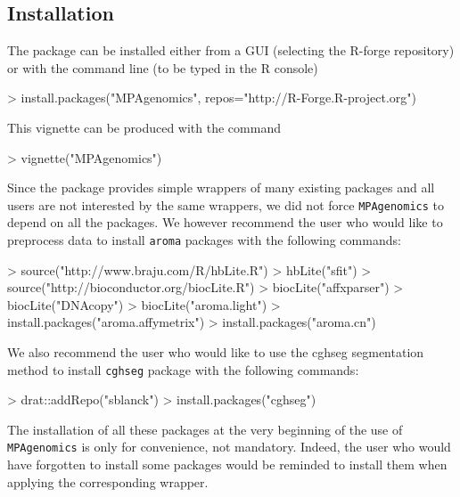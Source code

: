 \documentclass[a4paper,10pt]{article}
\begin{document}
  \subsection{Installation}
		The package can be installed either from a GUI (selecting the R-forge repository) or with the command line (to be typed in the R console)
\begin{Schunk}
\begin{Sinput}
> install.packages("MPAgenomics", repos="http://R-Forge.R-project.org")
\end{Sinput}
\end{Schunk}
		This vignette can be produced with the command
\begin{Schunk}
\begin{Sinput}
> vignette("MPAgenomics")
\end{Sinput}
\end{Schunk}
	
		
		Since the package provides simple wrappers of many existing packages and all users are not interested by the same wrappers, we did not force \texttt{MPAgenomics} to depend on all the packages. We however recommend the user who would like to preprocess data to install \texttt{aroma} packages \cite{aroma} with the following commands:
	
\begin{scriptsize}
\begin{Schunk}
\begin{Sinput}
> source("http://www.braju.com/R/hbLite.R")
> hbLite("sfit")
> source("http://bioconductor.org/biocLite.R")
> biocLite("affxparser")
> biocLite("DNAcopy")
> biocLite("aroma.light")
> install.packages("aroma.affymetrix")
> install.packages("aroma.cn")
\end{Sinput}
\end{Schunk}
\end{scriptsize}

We also recommend the user who would like to use the cghseg segmentation method to install \texttt{cghseg} package \cite{cghseg} with the following commands:
\begin{scriptsize}
\begin{Schunk}
\begin{Sinput}
> drat::addRepo("sblanck")
> install.packages("cghseg")
\end{Sinput}
\end{Schunk}
\end{scriptsize}


		The installation of all these packages at the very beginning of the use of \texttt{MPAgenomics} is only for convenience, not mandatory. Indeed, the user who would have forgotten to install some packages would be reminded to install them when applying the corresponding wrapper.
	
\end{document}
